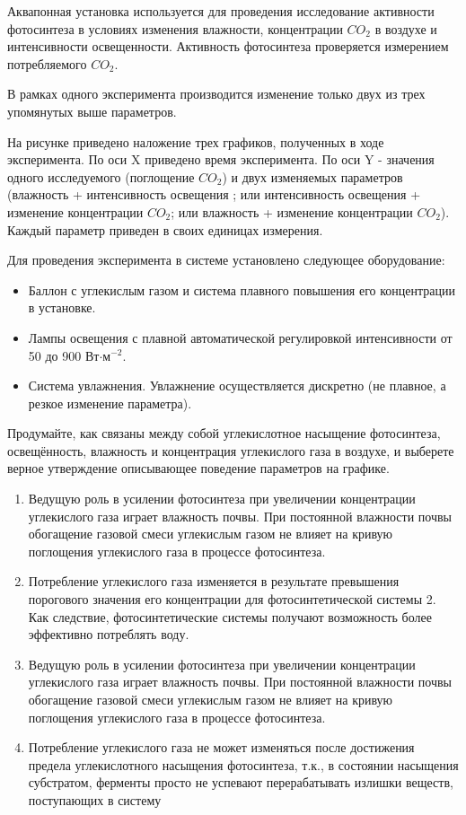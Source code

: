 
Аквапонная установка используется для проведения  исследование активности фотосинтеза в условиях 
изменения влажности, концентрации $CO_2$ в воздухе и интенсивности освещенности. Активность фотосинтеза проверяется измерением потребляемого $CO_2$.

В рамках одного эксперимента производится изменение только двух из трех упомянутых выше параметров.  

На рисунке приведено наложение трех графиков, полученных в ходе эксперимента. По оси X приведено время эксперимента. По оси Y - значения одного исследуемого (поглощение $CO_2$) и двух изменяемых параметров (влажность + интенсивность освещения ; или интенсивность освещения + изменение концентрации $CO_2$; или влажность + изменение концентрации $CO_2$). Каждый параметр приведен в своих единицах измерения.

Для проведения эксперимента в системе установлено следующее оборудование:

\begin{itemize}
    \item Баллон с углекислым газом и система плавного повышения его концентрации в установке.
    \item Лампы освещения с плавной автоматической регулировкой интенсивности от 50 до 900 Вт$\cdot$м$^{-2}$.
    \item Система увлажнения. Увлажнение осуществляется дискретно (не плавное, а резкое изменение параметра).
\end{itemize}

Продумайте, как связаны между собой углекислотное насыщение фотосинтеза, освещённость, влажность и концентрация углекислого газа в воздухе, и выберете верное утверждение описывающее поведение параметров на графике.


\begin{enumerate}
    \item Ведущую роль в усилении фотосинтеза при увеличении концентрации углекислого газа играет влажность почвы. При постоянной влажности почвы обогащение газовой смеси углекислым газом не влияет на кривую поглощения углекислого газа в процессе фотосинтеза.
    \item Потребление углекислого газа изменяется в результате превышения порогового значения его концентрации для фотосинтетической системы 2. Как следствие, фотосинтетические системы получают возможность более эффективно потреблять воду.
    \item Ведущую роль в усилении фотосинтеза при увеличении концентрации углекислого газа играет влажность почвы. При постоянной влажности почвы обогащение газовой смеси углекислым газом не влияет на кривую поглощения углекислого газа в процессе фотосинтеза.
    \item Потребление углекислого газа не может изменяться после достижения предела углекислотного насыщения фотосинтеза, т.к., в состоянии насыщения субстратом, ферменты просто не успевают перерабатывать излишки веществ, поступающих в систему
\end{enumerate}

